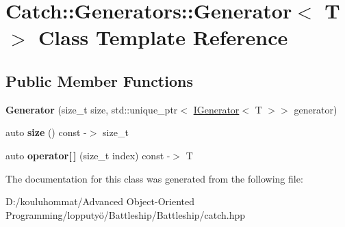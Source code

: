 \hypertarget{class_catch_1_1_generators_1_1_generator}{}\section{Catch\+:\+:Generators\+:\+:Generator$<$ T $>$ Class Template Reference}
\label{class_catch_1_1_generators_1_1_generator}
\subsection*{Public Member Functions}
\begin{DoxyCompactItemize}
\item 
\mbox{\label{class_catch_1_1_generators_1_1_generator_a3d992b33c5c1abb7370065c6ae10388f}} 
{\bfseries Generator} (size\+\_\+t size, std\+::unique\+\_\+ptr$<$ \mbox{\hyperlink{struct_catch_1_1_generators_1_1_i_generator}{I\+Generator}}$<$ T $>$$>$ generator)
\item 
\mbox{\label{class_catch_1_1_generators_1_1_generator_a4ebea9a7448f8f374bc7cff5d7b63041}} 
auto {\bfseries size} () const -\/$>$ size\+\_\+t
\item 
\mbox{\label{class_catch_1_1_generators_1_1_generator_ad8835935e962baaf1fab6c6dcac83865}} 
auto {\bfseries operator\mbox{[}$\,$\mbox{]}} (size\+\_\+t index) const -\/$>$ T
\end{DoxyCompactItemize}


The documentation for this class was generated from the following file\+:\begin{DoxyCompactItemize}
\item 
D\+:/kouluhommat/\+Advanced Object-\/\+Oriented Programming/lopputyö/\+Battleship/\+Battleship/catch.\+hpp\end{DoxyCompactItemize}
